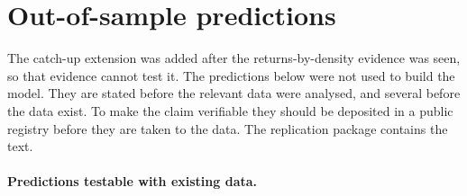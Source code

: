 \section{Out-of-sample predictions}\label{sec:predictions}

The catch-up extension was added after the returns-by-density evidence was
seen, so that evidence cannot test it. The predictions below were not used to
build the model. They are stated before the relevant data were analysed, and
several before the data exist. To make the claim verifiable they should be
deposited in a public registry before they are taken to the data. The
replication package contains the text.

\paragraph{Predictions testable with existing data.}

